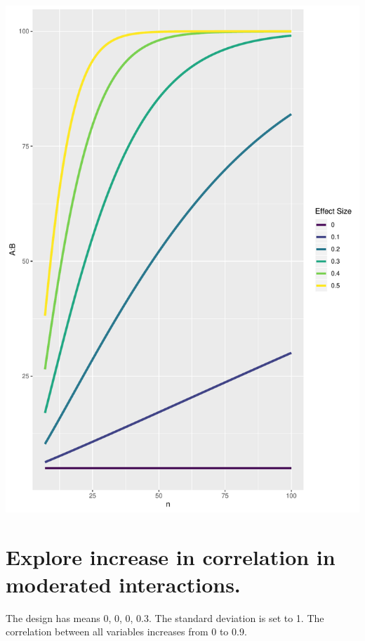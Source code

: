\documentclass[]{book}
\begin{document}
\includegraphics{SuperpowerValidation_files/figure-latex/unnamed-chunk-218-1.pdf}

\hypertarget{explore-increase-in-correlation-in-moderated-interactions.}{%
\section{Explore increase in correlation in moderated interactions.}\label{explore-increase-in-correlation-in-moderated-interactions.}}

The design has means 0, 0, 0, 0.3. The standard deviation is set to 1. The correlation between all variables increases from 0 to 0.9.
\end{document}

